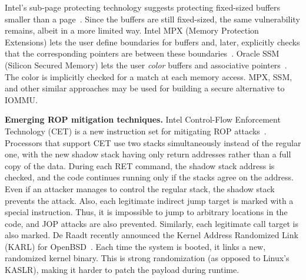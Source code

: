 Intel’s sub-page protecting technology suggests protecting fixed-sized buffers smaller than a page~\cite{Int18}. Since the buffers are still fixed-sized, the same vulnerability remains, albeit in a more limited way. Intel MPX (Memory Protection Extensions) lets the user define boundaries for buffers and, later, explicitly checks that the corresponding pointers are between these boundaries~\cite{Int16a}. Oracle SSM (Silicon Secured Memory) lets the user \emph{color} buffers and associative pointers~\cite{Ora15}. The color is implicitly checked for a match at each memory access. MPX, SSM, and other similar approaches may be used for building a secure alternative to IOMMU. 

\smallskip
\noindent\textbf{Emerging ROP mitigation techniques.}
Intel Control-Flow Enforcement Technology (CET) is a new instruction set for mitigating ROP attacks~\cite{Int17}. Processors that support CET use two stacks simultaneously instead of the regular one, with the new shadow stack having only return addresses rather than a full copy of the data. During each RET command, the shadow stack address is checked, and the code continues running only if the stacks agree on the address. Even if an attacker manages to control the regular stack, the shadow stack prevents the attack. Also, each legitimate indirect jump target is marked with a special instruction. Thus, it is impossible to jump to arbitrary locations in the code, and JOP attacks are also prevented. Similarly, each legitimate call target is also marked. De Raadt recently announced the Kernel Address Randomized Link (KARL) for OpenBSD~\cite{dr17}. Each time the system is booted, it links a new, randomized kernel binary. This is strong randomization (as opposed to Linux’s KASLR), making it harder to patch the payload during runtime. 

